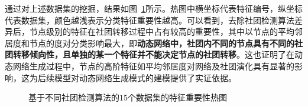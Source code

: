 通过对上述数据集的挖掘，结果如图~\ref{fig.3.3}所示。热图中横坐标代表特征编号，纵坐标代表数据集，颜色越浅表示分类特征重要性越高。可以看到，去除社团检测算法差异后，节点级别的特征在社团转移过程中占有较高的重要性，其中以节点的平均邻居度和节点的度对分类影响最大，即\textbf{动态网络中，社团内不同的节点具有不同的社团转移倾向性，且单独的某一个特征并不能决定节点的社团转移}。这也证明了在动态网络生成过程中，节点的高阶特征如平均邻居度对网络及社团演化具有显著的影响，这为后续模型对动态网络生成模式的建模提供了实证依据。


\begin{figure}[!htbp]
	\caption{基于不同社团检测算法的$15$个数据集的特征重要性热图}
	\label{fig.3.3}
\end{figure}

